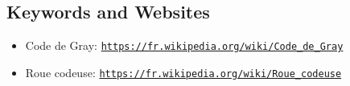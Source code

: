 \documentclass[a4paper,11pt]{report}
\newcommand{\BrochureUrlText}[1]{\texttt{#1}}
\begin{document}
{\raggedright

\subsection*{Keywords and Websites}

\begin{itemize}
  \item Code de Gray: \href{https://fr.wikipedia.org/wiki/Code_de_Gray}{\BrochureUrlText{https://fr.wikipedia.org/wiki/Code\_de\_Gray}}
  \item Roue codeuse: \href{https://fr.wikipedia.org/wiki/Roue_codeuse}{\BrochureUrlText{https://fr.wikipedia.org/wiki/Roue\_codeuse}}
\end{itemize}


}
\end{document}
